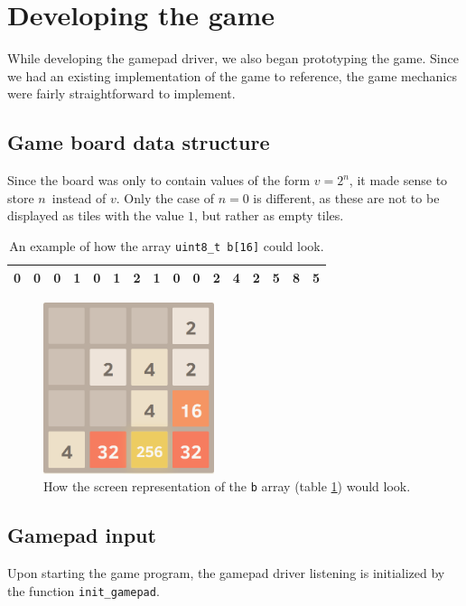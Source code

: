 \newpage
\section{Developing the game}
While developing the gamepad driver, we also began prototyping the game.
Since we had an existing implementation of the game \cite{2048} to reference,
the game mechanics were fairly straightforward to implement.

\subsection{Game board data structure}
Since the board was only to contain values of the form $v = 2^n$, it made sense to store $n$ instead of $v$. Only the case of $n = 0$ is different, as these are not to be displayed as tiles with the value $1$, but rather as empty tiles.

\begin{table}[h!]
    \centering
    \begin{tabular}{|l|l|l|l|l|l|l|l|l|l|l|l|l|l|l|l|}
        \hline
        0 & 0 & 0 & 1 & 0 & 1 & 2 & 1 & 0 & 0 & 2 & 4 & 2 & 5 & 8 & 5 \\ \hline
    \end{tabular}
    \caption{An example of how the array \texttt{uint8\_t b[16]} could look.}
    \label{array_b}
\end{table}

\begin{figure}[h!]
    \centering
    \includegraphics[width=5cm]{img/2048.png}
    \caption{How the screen representation of the \texttt{b} array (table \ref{array_b}) would look.}
\end{figure}

\newpage
\subsection{Gamepad input}
Upon starting the game program, the gamepad driver listening is initialized by the function \texttt{init\_gamepad}.

